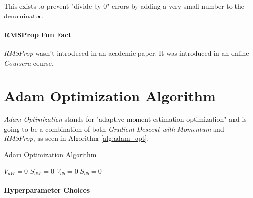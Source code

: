 \documentclass{article}
\begin{document}
This exists to prevent "divide by 0" errors by adding a very small number to the denominator.

\paragraph{RMSProp Fun Fact}

\textit{RMSProp} wasn't introduced in an academic paper.  It was introduced in an online \textit{Coursera} course.

\section{Adam Optimization Algorithm}

\textit{Adam Optimization} stands for "adaptive moment estimation optimization" and is going to be a combination of both \textit{Gradient Descent with Momentum} and \textit{RMSProp}, as seen in Algorithm \ref{alg:adam_opt}.

\begin{algorithm}[h]
\label{alg:adam_opt}
\caption{Adam Optimization Algorithm}
$V_{dW} = 0$ \;
$S_{dW} = 0$ \;
$V_{db} = 0$ \;
$S_{db} = 0$ \;

\end{algorithm}

\paragraph{Hyperparameter Choices}
\end{document}

